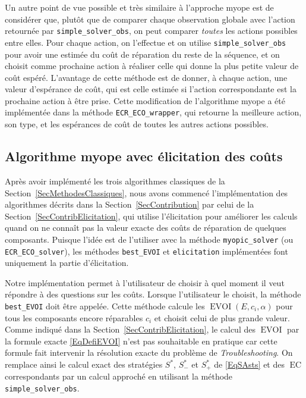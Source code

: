 \documentclass[a4paper,11pt]{article}
\theoremstyle{plain}
\theoremstyle{definition}
\DeclareMathOperator{\EC}{EC}
\DeclareMathOperator{\EVOI}{EVOI}
\begin{document}
Un autre point de vue possible et très similaire à l'approche myope est de considérer que, plutôt que de comparer chaque observation globale avec l'action retournée par \texttt{simple\_solver\_obs}, on peut comparer \emph{toutes} les actions possibles entre elles. Pour chaque action, on l'effectue et on utilise \texttt{simple\_solver\_obs} pour avoir une estimée du coût de réparation du reste de la séquence, et on choisit comme prochaine action à réaliser celle qui donne la plus petite valeur de coût espéré. L'avantage de cette méthode est de donner, à chaque action, une valeur d'espérance de coût, qui est celle estimée si l'action correspondante est la prochaine action à être prise. Cette modification de l'algorithme myope a été implémentée dans la méthode \texttt{ECR\_ECO\_wrapper}, qui retourne la meilleure action, son type, et les espérances de coût de toutes les autres actions possibles.

\subsection{Algorithme myope avec élicitation des coûts}
\label{SecImplElicitation}

Après avoir implémenté les trois algorithmes classiques de la Section~\ref{SecMethodesClassiques}, nous avons commencé l'implémentation des algorithmes décrits dans la Section~\ref{SecContribution} par celui de la Section~\ref{SecContribElicitation}, qui utilise l'élicitation pour améliorer les calculs quand on ne connaît pas la valeur exacte des coûts de réparation de quelques composants. Puisque l'idée est de l'utiliser avec la méthode \texttt{myopic\_solver} (ou \texttt{ECR\_ECO\_solver}), les méthodes \texttt{best\_EVOI} et \texttt{elicitation} implémentées font uniquement la partie d'élicitation.

Notre implémentation permet à l'utilisateur de choisir à quel moment il veut répondre à des questions sur les coûts. Lorsque l'utilisateur le choisit, la méthode \texttt{best\_EVOI} doit être appelée. Cette méthode calcule les $\EVOI(E, c_i, \alpha)$ pour tous les composants encore réparables $c_i$ et choisit celui de plus grande valeur. Comme indiqué dans la Section~\ref{SecContribElicitation}, le calcul des $\EVOI$ par la formule exacte \eqref{EqDefiEVOI} n'est pas souhaitable en pratique car cette formule fait intervenir la résolution exacte du problème de \emph{Troubleshooting}. On remplace ainsi le calcul exact des stratégies $S^\ast$, $S_-^\ast$ et $S_+^\ast$ de \eqref{EqSAsts} et des $\EC$ correspondants par un calcul approché en utilisant la méthode \texttt{simple\_solver\_obs}.
\end{document}
